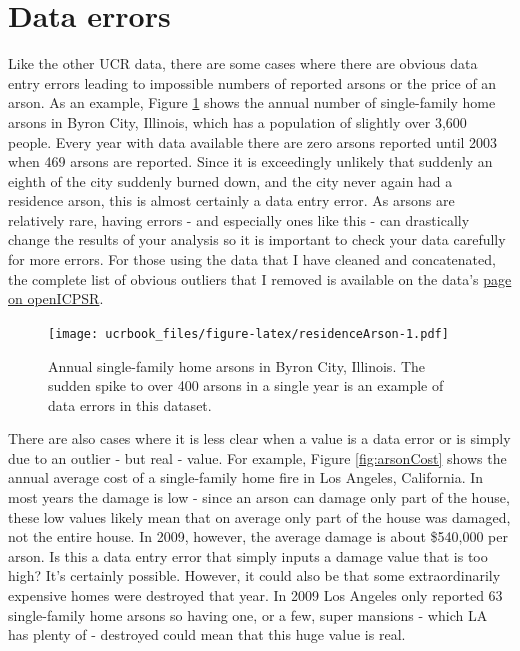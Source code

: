 \documentclass[
  12pt,
  openany]{book}
\begin{document}
\hypertarget{data-errors}{%
\section{Data errors}\label{data-errors}}

Like the other UCR data, there are some cases where there are obvious data entry errors leading to impossible numbers of reported arsons or the price of an arson. As an example, Figure \ref{fig:residenceArson} shows the annual number of single-family home arsons in Byron City, Illinois, which has a population of slightly over 3,600 people. Every year with data available there are zero arsons reported until 2003 when 469 arsons are reported. Since it is exceedingly unlikely that suddenly an eighth of the city suddenly burned down, and the city never again had a residence arson, this is almost certainly a data entry error. As arsons are relatively rare, having errors - and especially ones like this - can drastically change the results of your analysis so it is important to check your data carefully for more errors. For those using the data that I have cleaned and concatenated, the complete list of obvious outliers that I removed is available on the data's \href{https://www.openicpsr.org/openicpsr/project/103540/version/V9/view}{page on openICPSR}.

\begin{figure}
\centering
\texttt{[image: ucrbook\_files/figure-latex/residenceArson-1.pdf]}
\caption{\label{fig:residenceArson}Annual single-family home arsons in Byron City, Illinois. The sudden spike to over 400 arsons in a single year is an example of data errors in this dataset.}
\end{figure}

There are also cases where it is less clear when a value is a data error or is simply due to an outlier - but real - value. For example, Figure \ref{fig:arsonCost} shows the annual average cost of a single-family home fire in Los Angeles, California. In most years the damage is low - since an arson can damage only part of the house, these low values likely mean that on average only part of the house was damaged, not the entire house. In 2009, however, the average damage is about \$540,000 per arson. Is this a data entry error that simply inputs a damage value that is too high? It's certainly possible. However, it could also be that some extraordinarily expensive homes were destroyed that year. In 2009 Los Angeles only reported 63 single-family home arsons so having one, or a few, super mansions - which LA has plenty of - destroyed could mean that this huge value is real.
\end{document}
